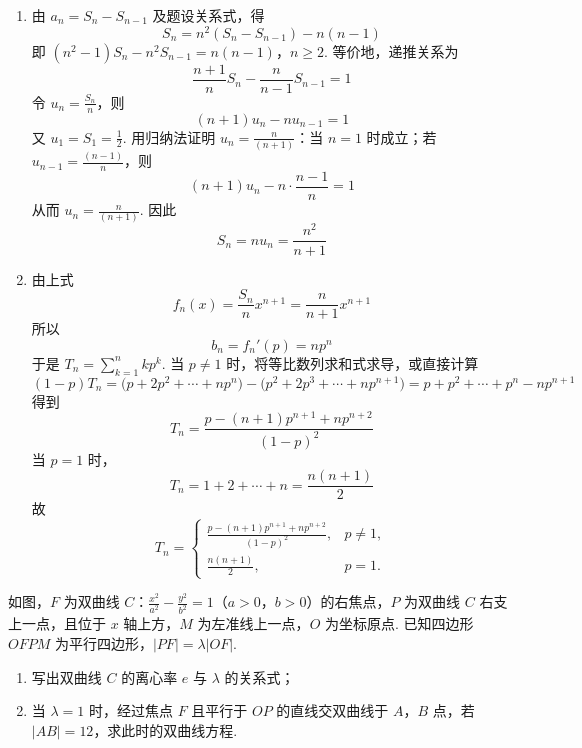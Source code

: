 \begin{solution}
\begin{enumerate}
\item 由 \(a_n=S_n-S_{n-1}\) 及题设关系式，得
\[
S_n=n^2(S_n-S_{n-1})-n(n-1)
\]
即
\((n^2-1)S_n-n^2S_{n-1}=n(n-1)\)，\(n\geqslant2\).
等价地，递推关系为
\[
\frac{n+1}{n}S_n-\frac{n}{n-1}S_{n-1}=1
\]
令 \(u_n=\frac{S_n}{n}\)，则
\[
(n+1)u_n-nu_{n-1}=1
\]
又 \(u_1=S_1=\frac{1}{2}\). 用归纳法证明 \(u_n=\frac{n}{(n+1)}\)：当 \(n=1\) 时成立；若 \(u_{n-1}=\frac{(n-1)}{n}\)，则
\[
(n+1)u_n-n\cdot\frac{n-1}{n}=1
\]
从而 \(u_n=\frac{n}{(n+1)}\). 因此
\[
S_n=nu_n=\frac{n^2}{n+1}
\]

\item 由上式
\[
f_n(x)=\frac{S_n}{n}x^{n+1}=\frac{n}{n+1}x^{n+1}
\]
所以
\[
b_n=f_n'(p)=np^n
\]
于是 \(T_n=\sum_{k=1}^nkp^k\). 当 \(p\neq1\) 时，将等比数列求和式求导，或直接计算
\[
(1-p)T_n
=\bigl(p+2p^2+\cdots+np^n\bigr)
-\bigl(p^2+2p^3+\cdots+np^{n+1}\bigr)
=p+p^2+\cdots+p^n-np^{n+1}
\]
得到
\[
T_n=\frac{p-(n+1)p^{n+1}+np^{n+2}}{(1-p)^2}
\]
当 \(p=1\) 时，
\[
T_n=1+2+\cdots+n=\frac{n(n+1)}2
\]
故
\[
T_{n}=\begin{cases}
\displaystyle\frac{p-(n+1)p^{n+1}+np^{n+2}}{(1-p)^{2}}, & p\neq 1,\\
\displaystyle\frac{n(n+1)}{2}, & p=1.
\end{cases}
\]
\end{enumerate}
\end{solution}

\begin{problem}
如图，\(F\) 为双曲线 \(C\)：\(\frac{x^{2}}{a^{2}} - \frac{y^{2}}{b^{2}} = 1\)（\(a > 0\)，\(b > 0\)）的右焦点，\(P\) 为双曲线 \(C\) 右支上一点，且位于 \(x\) 轴上方，\(M\) 为左准线上一点，\(O\) 为坐标原点. 已知四边形 \(OFPM\) 为平行四边形，\(|PF| = \lambda |OF|\).

\begin{enumerate}
\item 写出双曲线 \(C\) 的离心率 \(e\) 与 \(\lambda\) 的关系式；
\item 当 \(\lambda = 1\) 时，经过焦点 \(F\) 且平行于 \(OP\) 的直线交双曲线于 \(A\)，\(B\) 点，若 \(|AB| = 12\)，求此时的双曲线方程.
\end{enumerate}

\end{problem}

